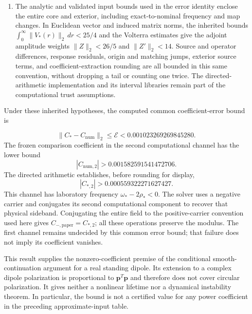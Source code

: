 \begin{enumerate}
\item The analytic and validated input bounds used in the error identity
enclose the entire core and exterior, including exact-to-nominal
frequency and map changes. In Euclidean vector and induced matrix norms,
the inherited bounds
$\int_0^\infty\|V_*(r)\|_2\,dr<25/4$ and the Volterra estimates give
the adjoint amplitude weights $\|Z\|_2<26/5$ and $\|Z'\|_2<14$.
Source and operator differences, response residuals, origin and matching
jumps, exterior source terms, and coefficient-extraction rounding are
all bounded in this same convention, without dropping a tail or counting
one twice. The directed-arithmetic implementation and its interval
libraries remain part of the computational trust assumptions.
\end{enumerate}
Under these inherited hypotheses, the computed common coefficient-error
bound is

\begin{equation}
 \|C_* - C_{\mathrm{num}}\|_2
 \leq \mathcal E < 0.001023269269845280.
\end{equation}
The frozen comparison coefficient in the second computational channel
has the lower bound
\begin{equation}
 |C_{\mathrm{num},2}| > 0.001582591541472706.
\end{equation}
The directed arithmetic establishes, before rounding for display,
\begin{equation}
 |C_{*,2}| > 0.000559322271627427.
\end{equation}
This channel has laboratory frequency $\omega_*-2\rho_*<0$.
The solver uses a negative carrier and conjugates its second computational
component to recover that physical sideband. Conjugating the entire field
to the positive-carrier convention used here gives
$C_{-,\mathrm{paper}}=C_{*,2}$; all these operations preserve the modulus.
The first channel remains undecided by this common error bound; that
failure does not imply its coefficient vanishes.

This result supplies the nonzero-coefficient premise of the conditional
smooth-continuation argument for a real standing dipole. Its extension
to a complex dipole polarization is proportional to
$\boldsymbol p^T\boldsymbol p$ and therefore does not cover circular
polarization. It gives neither a nonlinear lifetime nor a dynamical
instability theorem. In particular, the bound is not a certified value
for any power coefficient in the preceding approximate-input table.
